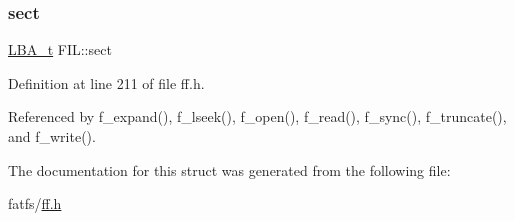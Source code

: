 \mbox{\label{structFIL_aa3f9f9ed9341b765862d073a95c86001}} 
\subsubsection{\texorpdfstring{sect}{sect}}
{\footnotesize\ttfamily \hyperlink{ff_8h_a1f3c30a83148a28340f009d4e583f087}{L\+B\+A\+\_\+t} F\+I\+L\+::sect}



Definition at line 211 of file ff.\+h.



Referenced by f\+\_\+expand(), f\+\_\+lseek(), f\+\_\+open(), f\+\_\+read(), f\+\_\+sync(), f\+\_\+truncate(), and f\+\_\+write().



The documentation for this struct was generated from the following file\+:\begin{DoxyCompactItemize}
\item 
fatfs/\hyperlink{ff_8h}{ff.\+h}\end{DoxyCompactItemize}
